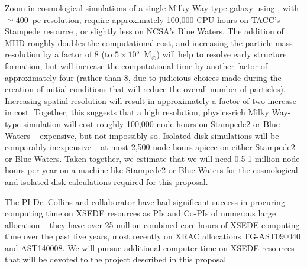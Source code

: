 Zoom-in cosmological simulations of a single Milky Way-type galaxy
using \enzo, with $\simeq 400$~pc resolution, require approximately
100,000 CPU-hours on TACC's Stampede resource
\cite{2012ApJ...749..140H,2012ApJ...759..137J,2013MNRAS.430.1548H}, or
slightly less on NCSA's Blue Waters.  The addition of MHD roughly
doubles the computational cost, and increasing the particle mass
resolution by a factor of 8 (to $5 \times 10^5$~M$_\odot$) will help
to resolve early structure formation, but will increase the
computational time by another factor of approximately four (rather
than 8, due to judicious choices made during the creation of initial
conditions that will reduce the overall number of particles).
Increasing spatial resolution will result in approximately a factor of
two increase in cost.  Together, this suggests that a high resolution,
physics-rich Milky Way-type simulation will cost roughly 100,000
node-hours on Stampede2 or Blue Waters -- expensive, but not impossibly
so.  
Isolated disk simulations will
be comparably inexpensive -- at most 2,500 node-hours apiece on either
Stampede2 or Blue Waters.  Taken together, we estimate that we will
need 0.5-1 million node-hours per year on a machine like Stampede2 or
Blue Waters for the cosmological and isolated disk calculations
required for this proposal.

The PI Dr. Collins and collaborator have had significant success in procuring
computing time on XSEDE resources as PIs and Co-PIs of numerous large
allocation -- they have over 25 million combined core-hours of XSEDE
computing time over the past five years, most recently on XRAC
allocations TG-AST090040 and AST140008.  
We will pursue additional
computer time on XSEDE resources 
that will be devoted to the
project described in this proposal


